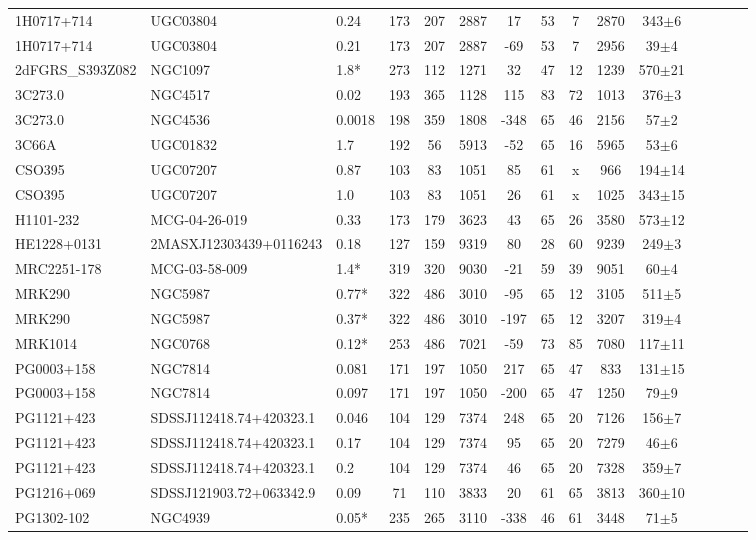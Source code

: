\documentclass[iop]{emulateapj-rtx4}
\begin{document}
\begin{table}[ht]
\begin{center}
\begin{tabular}{l l l c c c c c c c c c c c c}
1H0717+714 & UGC03804 & 0.24 & 173 & 207 & 2887 & 17 & 53 & 7 & 2870 & 343$\pm$6\\
1H0717+714 & UGC03804 & 0.21 & 173 & 207 & 2887 & -69 & 53 & 7 & 2956 & 39$\pm$4\\
2dFGRS\_S393Z082 & NGC1097 & 1.8* & 273 & 112 & 1271 & 32 & 47 & 12 & 1239 & 570$\pm$21\\
3C273.0 & NGC4517 & 0.02 & 193 & 365 & 1128 & 115 & 83 & 72 & 1013 & 376$\pm$3\\
3C273.0 & NGC4536 & 0.0018 & 198 & 359 & 1808 & -348 & 65 & 46 & 2156 & 57$\pm$2\\
3C66A & UGC01832 & 1.7 & 192 & 56 & 5913 & -52 & 65 & 16 & 5965 & 53$\pm$6\\
CSO395 & UGC07207 & 0.87 & 103 & 83 & 1051 & 85 & 61 & x & 966 & 194$\pm$14\\
CSO395 & UGC07207 & 1.0 & 103 & 83 & 1051 & 26 & 61 & x & 1025 & 343$\pm$15\\
H1101-232 & MCG-04-26-019 & 0.33 & 173 & 179 & 3623 & 43 & 65 & 26 & 3580 & 573$\pm$12\\
HE1228+0131 & 2MASXJ12303439+0116243 & 0.18 & 127 & 159 & 9319 & 80 & 28 & 60 & 9239 & 249$\pm$3\\
MRC2251-178 & MCG-03-58-009 & 1.4* & 319 & 320 & 9030 & -21 & 59 & 39 & 9051 & 60$\pm$4\\
MRK290 & NGC5987 & 0.77* & 322 & 486 & 3010 & -95 & 65 & 12 & 3105 & 511$\pm$5\\
MRK290 & NGC5987 & 0.37* & 322 & 486 & 3010 & -197 & 65 & 12 & 3207 & 319$\pm$4\\
MRK1014 & NGC0768 & 0.12* & 253 & 486 & 7021 & -59 & 73 & 85 & 7080 & 117$\pm$11\\
PG0003+158 & NGC7814 & 0.081 & 171 & 197 & 1050 & 217 & 65 & 47 & 833 & 131$\pm$15\\
PG0003+158 & NGC7814 & 0.097 & 171 & 197 & 1050 & -200 & 65 & 47 & 1250 & 79$\pm$9\\
PG1121+423 & SDSSJ112418.74+420323.1 & 0.046 & 104 & 129 & 7374 & 248 & 65 & 20 & 7126 & 156$\pm$7\\
PG1121+423 & SDSSJ112418.74+420323.1 & 0.17 & 104 & 129 & 7374 & 95 & 65 & 20 & 7279 & 46$\pm$6\\
PG1121+423 & SDSSJ112418.74+420323.1 & 0.2 & 104 & 129 & 7374 & 46 & 65 & 20 & 7328 & 359$\pm$7\\
PG1216+069 & SDSSJ121903.72+063342.9 & 0.09 & 71 & 110 & 3833 & 20 & 61 & 65 & 3813 & 360$\pm$10\\
PG1302-102 & NGC4939 & 0.05* & 235 & 265 & 3110 & -338 & 46 & 61 & 3448 & 71$\pm$5\\

\end{tabular}
\end{center}
\end{table}
\end{document}
